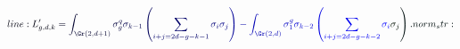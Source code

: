 \documentclass[12pt]{article}
\begin{document}
\makeatletter
\renewcommand*{\@textcolor}[3]{%
  \protect\leavevmode
  \begingroup
    \color#1{#2}#3%
  \endgroup
}
\makeatother
\begin{displaymath}
\mathcolor[RGB]{0,0,15}{line:
L'_{g,d,k}} \mathcolor[RGB]{0,0,30}{=} \mathcolor[RGB]{0,0,45}{\int_{\Gr(2,d+1)}} \mathcolor[RGB]{0,0,60}{\sigma_g^q} \mathcolor[RGB]{0,0,75}{\sigma_{k-1}} \mathcolor[RGB]{0,0,90}{\left(} \mathcolor[RGB]{0,0,105}{\sum_{i+j=2d-g-k-1}} \mathcolor[RGB]{0,0,120}{\sigma_i} \mathcolor[RGB]{0,0,135}{\sigma_j} \mathcolor[RGB]{0,0,150}{\right)} \mathcolor[RGB]{0,0,165}{-} \mathcolor[RGB]{0,0,180}{\int_{\Gr(2,d)}} \mathcolor[RGB]{0,0,195}{\sigma_1^g} \mathcolor[RGB]{0,0,210}{\sigma_{k-2}} \mathcolor[RGB]{0,0,225}{\left(} \mathcolor[RGB]{0,0,240}{\sum_{i+j=2d-g-k-2}} \mathcolor[RGB]{0,0,255}{\sigma_i} \mathcolor[RGB]{0,15,0}{\sigma_j} \mathcolor[RGB]{0,15,15}{\right).

norm_str:}
\end{displaymath}
\end{document}
